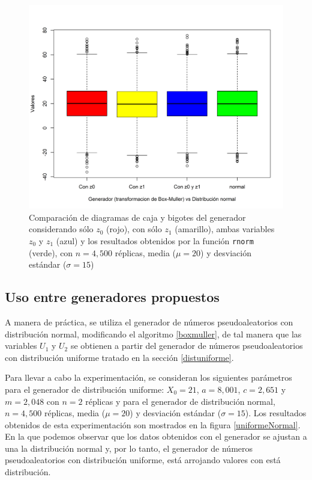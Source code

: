 \documentclass{article}
\begin{document}
\begin{figure}
\centering
\includegraphics[width=\linewidth]{Figures/comparativosZ.png}
\caption{Comparación de diagramas de caja y bigotes del generador considerando sólo $z_{0}$ (rojo), con sólo $z_{1}$ (amarillo), ambas variables $z_{0}$ y $z_{1}$ (azul) y los resultados obtenidos por la función \texttt{rnorm} (verde), con $n= 4,500$ réplicas, media ($\mu = 20$) y desviación estándar ($\sigma = 15$)}
\label{escenario2-3}
\end{figure}

\subsection{Uso entre generadores propuestos}

A manera de práctica, se utiliza el generador de números pseudoaleatorios con distribución normal, modificando el algoritmo \ref{boxmuller}, de tal manera que las variables $U_{1}$ y $U_{2}$ se obtienen a partir del generador de números pseudoaleatorios con distribución uniforme tratado en la sección \ref{distuniforme}. 

Para llevar a cabo la experimentación, se consideran los siguientes parámetros para el generador de distribución uniforme: $X_{0}=21$, $a = 8,001$, $c = 2,651$ y $m = 2,048$ con $n=2$ réplicas y para el generador de distribución normal, $n= 4,500$ réplicas, media ($\mu = 20$) y desviación estándar ($\sigma = 15$). Los resultados obtenidos de esta experimentación son mostrados en la figura \ref{uniformeNormal}. En la que podemos observar que los datos obtenidos con el generador se ajustan a una la distribución normal y, por lo tanto, el generador de números pseudoaleatorios con distribución uniforme, está arrojando valores con está distribución.
\end{document}
